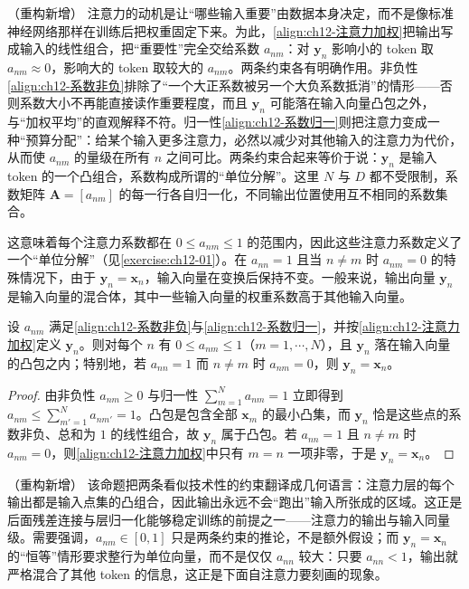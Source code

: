 \documentclass[../../main.tex]{subfiles}
\begin{document}
\begin{remark}（重构新增）
注意力的动机是让“哪些输入重要”由数据本身决定，而不是像标准神经网络那样在训练后把权重固定下来。为此，\eqref{align:ch12-注意力加权}把输出写成输入的线性组合，把“重要性”完全交给系数 $a_{nm}$：对 $\mathbf{y}_n$ 影响小的 token 取 $a_{nm}\approx0$，影响大的 token 取较大的 $a_{nm}$。两条约束各有明确作用。非负性\eqref{align:ch12-系数非负}排除了“一个大正系数被另一个大负系数抵消”的情形——否则系数大小不再能直接读作重要程度，而且 $\mathbf{y}_n$ 可能落在输入向量凸包之外，与“加权平均”的直观解释不符。归一性\eqref{align:ch12-系数归一}则把注意力变成一种“预算分配”：给某个输入更多注意力，必然以减少对其他输入的注意力为代价，从而使 $a_{nm}$ 的量级在所有 $n$ 之间可比。两条约束合起来等价于说：$\mathbf{y}_n$ 是输入 token 的一个凸组合，系数构成所谓的“单位分解”。这里 $N$ 与 $D$ 都不受限制，系数矩阵 $\mathbf{A}=[a_{nm}]$ 的每一行各自归一化，不同输出位置使用互不相同的系数集合。
\end{remark}

这意味着每个注意力系数都在 $0\leqslant a_{nm}\leqslant1$ 的范围内，因此这些注意力系数定义了一个“单位分解”（见\cref{exercise:ch12-01}）。在 $a_{nn}=1$ 且当 $n\neq m$ 时 $a_{nm}=0$ 的特殊情况下，由于 $\mathbf{y}_n=\mathbf{x}_n$，输入向量在变换后保持不变。一般来说，输出向量 $\mathbf{y}_n$ 是输入向量的混合体，其中一些输入向量的权重系数高于其他输入向量。

\begin{proposition}[注意力系数构成单位分解]\label{proposition:ch12-单位分解}
设 $a_{nm}$ 满足\eqref{align:ch12-系数非负}与\eqref{align:ch12-系数归一}，并按\eqref{align:ch12-注意力加权}定义 $\mathbf{y}_n$。则对每个 $n$ 有 $0\leqslant a_{nm}\leqslant1$（$m=1,\cdots,N$），且 $\mathbf{y}_n$ 落在输入向量的凸包之内；特别地，若 $a_{nn}=1$ 而 $n\neq m$ 时 $a_{nm}=0$，则 $\mathbf{y}_n=\mathbf{x}_n$。
\end{proposition}

\begin{proof}
由非负性 $a_{nm}\geqslant0$ 与归一性 $\sum_{m=1}^{N}a_{nm}=1$ 立即得到 $a_{nm}\leqslant\sum_{m'=1}^{N}a_{nm'}=1$。凸包是包含全部 $\mathbf{x}_m$ 的最小凸集，而 $\mathbf{y}_n$ 恰是这些点的系数非负、总和为 $1$ 的线性组合，故 $\mathbf{y}_n$ 属于凸包。若 $a_{nn}=1$ 且 $n\neq m$ 时 $a_{nm}=0$，则\eqref{align:ch12-注意力加权}中只有 $m=n$ 一项非零，于是 $\mathbf{y}_n=\mathbf{x}_n$。
\end{proof}

\begin{remark}（重构新增）
该命题把两条看似技术性的约束翻译成几何语言：注意力层的每个输出都是输入点集的凸组合，因此输出永远不会“跑出”输入所张成的区域。这正是后面残差连接与层归一化能够稳定训练的前提之一——注意力的输出与输入同量级。需要强调，$a_{nm}\in[0,1]$ 只是两条约束的推论，不是额外假设；而 $\mathbf{y}_n=\mathbf{x}_n$ 的“恒等”情形要求整行为单位向量，而不是仅仅 $a_{nn}$ 较大：只要 $a_{nn}<1$，输出就严格混合了其他 token 的信息，这正是下面自注意力要刻画的现象。
\end{remark}
\end{document}
